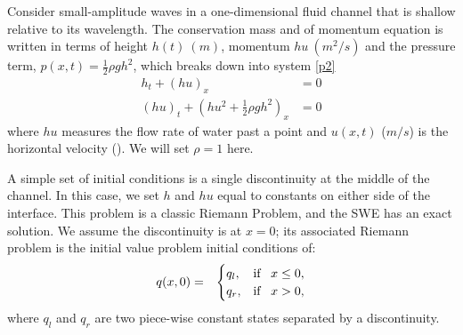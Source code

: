 \documentclass[10pt,a4paper]{article}
\begin{document}
		Consider small-amplitude waves in a one-dimensional fluid channel that is shallow relative to its wavelength. The conservation mass and of momentum equation is written in terms of height $h(t)~(m)$, momentum $hu~(m^{2}/s)$ and  the pressure term, $p(x,t) = \frac{1}{2}\rho gh^{2}$, which breaks down into system \eqref{p2}
	\begin{equation}
		\begin{aligned}
			h_{t} + (hu)_x &= 0 \\
			(hu)_t + \left(hu^{2} + \frac{1}{2}\rho gh^{2} \right)_x & = 0 
		\end{aligned}
		\label{p2}
	\end{equation}	
	where $hu$ measures the flow rate of water past a point and $u(x,t)$ ($m/s$) is the horizontal velocity  (\cite{leveque2002finite,toro2001shock}).  We will set $\rho = 1$ here.
	
	A simple set of initial conditions is a single discontinuity at the middle of the channel.  In this case, we set $h$ and $hu$ equal to constants on either side of the interface.  This problem is a classic Riemann Problem, and the SWE has an exact solution.  We assume the discontinuity is at $x = 0$; its associated Riemann problem is the initial value problem initial conditions of:
		\begin{eqnarray}
		q(x,0)& =& \begin{cases}
			q_{l}, & \text{if \, $x \le 0,$}\\
			q_{r},& \text{if \, $x > 0,$}\\
			
		\end{cases}  
		\label{rp1}     
	\end{eqnarray}
where $q_{l}$ and $q_{r}$ are two piece-wise constant states separated by a discontinuity. 
\end{document}
